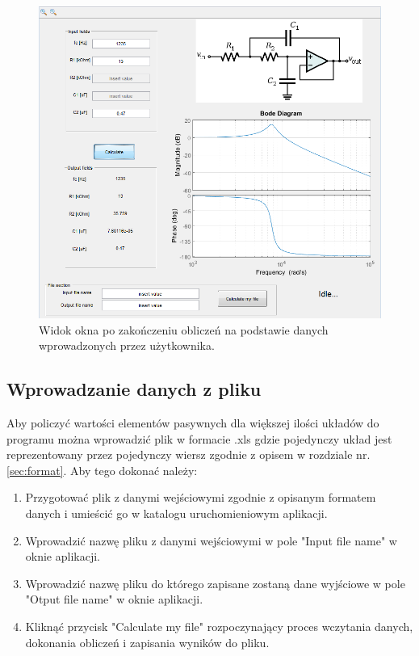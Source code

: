\documentclass[a4paper,12pt]{article}
\begin{document}
		\begin{figure}[!htbp]
 				\centering
					 \includegraphics[width=\textwidth]{../Pictures/i2.png}
 					 \caption{Widok okna po zakończeniu obliczeń na podstawie danych 
 					 wprowadzonych przez użytkownika.}
					 \label{fig:dane}
			\end{figure}
			

	\subsection{Wprowadzanie danych z pliku}
	
		Aby policzyć wartości elementów pasywnych dla większej ilości układów
		do programu można wprowadzić plik w formacie .xls gdzie pojedynczy układ jest 
		reprezentowany przez pojedynczy wiersz zgodnie z opisem w rozdziale nr.
		\ref{sec:format}. Aby tego dokonać należy:
		
		\begin{enumerate}
			\item Przygotować plik z danymi wejściowymi zgodnie z opisanym formatem
			danych i umieścić go w katalogu uruchomieniowym aplikacji.
			\item Wprowadzić nazwę pliku z danymi wejściowymi
			w pole "Input file name" w oknie aplikacji.
			\item Wprowadzić nazwę pliku do którego zapisane zostaną dane wyjściowe 
			w pole "Otput file name" w oknie aplikacji.
			\item Kliknąć przycisk "Calculate my file" rozpoczynający proces wczytania 
			danych, dokonania obliczeń i zapisania wyników do pliku.
		\end{enumerate}
			
\end{document}
